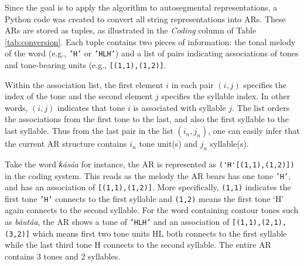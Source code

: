 \documentclass[11pt,letterpaper]{article}
\begin{document}
Since the goal is to apply the algorithm to autosegmental representations, a Python code was created to convert all string representations into ARs. These ARs are stored as tuples, as illustrated in the \textit{Coding} column of Table \ref{tab:conversion}. Each tuple contains two pieces of information: the tonal melody of the word (e.g., \texttt{'H'} or \texttt{'HLH'}) and a list of pairs indicating associations of tones and tone-bearing units (e.g., \verb|[(1,1),(1,2)]|.

 Within the association list, the first element $i$ in each pair $(i,j)$ specifies the index of the tone and the second element $j$ specifies the syllable index. In other words, $(i,j)$ indicates that tone $i$ is associated with syllable $j$. The list orders the associations from the first tone to the last, and also the first syllable to the last syllable. Thus from the last pair in the list $(i_n,j_n)$, one can easily infer that the current AR structure contains $i_n$ tone unit(s) and $j_n$ syllable(s).

Take the word \textit{ƙásáa} for instance, the AR is represented as \verb|('H'[(1,1),(1,2)])| in the coding system. This reads as the melody the AR bears has one tone \texttt{'H'}, and has an association of \verb|[(1,1),(1,2)]|. More specifically, \verb|(1,1)| indicates the first tone \texttt{'H'} connects to the first syllable and \verb|(1,2)| means the first tone `H' again connects to the second syllable. For the word containing contour tones such as \textit{bâutáa}, the AR shows a tone of \texttt{'HLH'} and an association of \verb|[(1,1),(2,1),(3,2)]| which means first two tone units HL both connects to the first syllable while the last third tone H connects to the second syllable. The entire AR contains 3 tones and 2 syllables.
\end{document}

